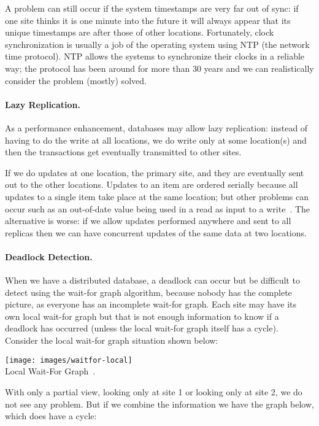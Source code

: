 \documentclass[a4paper]{report}
\begin{document}
A problem can still occur if the system timestamps are very far out of sync: if one site thinks it is one minute into the future it will always appear that its unique timestamps are after those of other locations. Fortunately, clock synchronization is usually a job of the operating system using NTP (the network time protocol). NTP allows the systems to synchronize their clocks in a reliable way; the protocol has been around for more than 30 years and we can realistically consider the problem (mostly) solved.

\paragraph{Lazy Replication.} As a performance enhancement, databases may allow lazy replication: instead of having to do the write at all locations, we do write only at some location(s) and then the transactions get eventually transmitted to other sites.

If we do updates at one location, the primary site, and they are eventually sent out to the other locations. Updates to an item are ordered serially because all updates to a single item take place at the same location; but other problems can occur such as an out-of-date value being used in a read as input to a write~\cite{dsc}. The alternative is worse: if we allow updates performed anywhere and sent to all replicas then we can have concurrent updates of the same data at two locations.

\paragraph{Deadlock Detection.}

When we have a distributed database, a deadlock can occur but be difficult to detect using the wait-for graph algorithm, because nobody has the complete picture, as everyone has an incomplete wait-for graph. Each site may have its own local wait-for graph but that is not enough information to know if a deadlock has occurred (unless the local wait-for graph itself has a cycle). Consider the local wait-for graph situation shown below:

\begin{center}
\texttt{[image: images/waitfor-local]}\\
Local Wait-For Graph~\cite{dsc}.
\end{center}

With only a partial view, looking only at site 1 or looking only at site 2, we do not see any problem. But if we combine the information we have the graph below, which does have a cycle:
\end{document}
